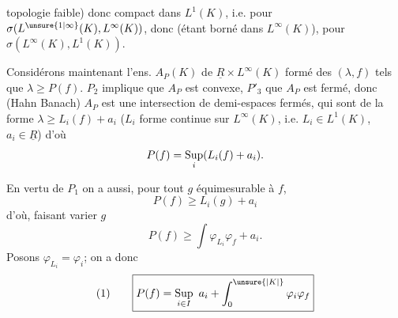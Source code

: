 topologie faible) donc  compact dans $L^1(K)$,  i.e.
pour $\sigma(L^{\unsure{1|\infty}}(K),L^\infty(K))$, donc (étant borné dans $L^\infty(K)$), pour $\sigma(L^\infty(K),L^1(K))$.


Considérons maintenant l'ens. $A_P(K)$ de $\underline{R}\times L^\infty(K)$ formé des $(\lambda,f)$ tels que $\lambda\geq P(f)$.
$P_2$ implique que $A_P$ est convexe, $P'_3$ que $A_P$ est  fermé, donc (Hahn Banach) $A_P$ est une intersection de demi-espaces  fermés, qui sont  de la forme $\lambda\geq L_i(f)+a_i$ ($L_i$ forme  continue sur $L^\infty(K)$, i.e. $L_i\in L^1(K)$,  $a_i\in\underline{R}$) d'où
\[
P(f)=\mathop{\rm Sup}_i(L_i(f)+a_i).
\]

En vertu de $P_1$ on a  aussi, pour tout $g$   équimesurable à $f$,
\[
P(f)\geq L_i(g)+a_i
\]
d'où,  faisant varier $g$
\[
P(f)\geq\int\varphi_{L_i}\varphi_f+a_i.
\]
Posons $\varphi_{L_i}=\varphi_i$; on a donc
\[
(1)\qquad \boxed{P(f)=\mathop{\rm Sup}_{i\in I}\ a_i+\int_0^{\unsure{|K|}}\varphi_i\varphi_f}
\]
